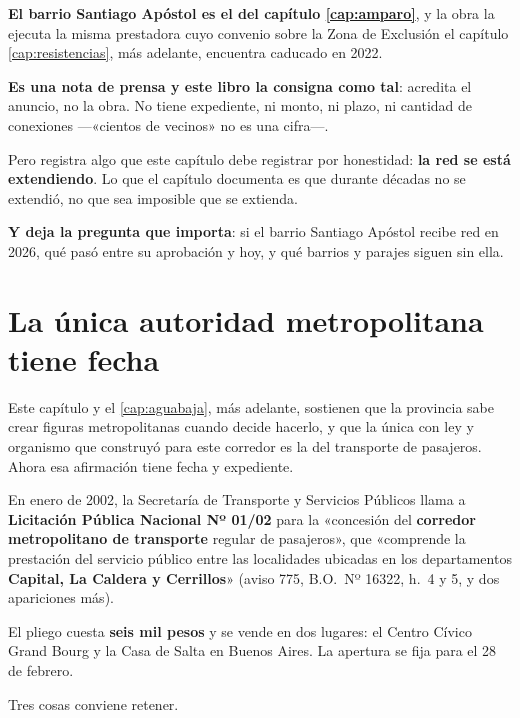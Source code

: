 \textbf{El barrio Santiago Apóstol es el del capítulo \ref{cap:amparo}}, y la obra la ejecuta la
misma prestadora cuyo convenio sobre la Zona de Exclusión el capítulo \ref{cap:resistencias}, más adelante,
encuentra caducado en 2022.

\begin{cautela}
\textbf{Es una nota de prensa y este libro la consigna como tal}: acredita el anuncio, no la
obra. No tiene expediente, ni monto, ni plazo, ni cantidad de conexiones ---«cientos de
vecinos» no es una cifra---.

Pero registra algo que este capítulo debe registrar por honestidad: \textbf{la red se está
extendiendo}. Lo que el capítulo documenta es que durante décadas no se extendió, no que sea
imposible que se extienda.

\textbf{Y deja la pregunta que importa}: si el barrio Santiago Apóstol recibe red en 2026, qué
pasó entre su aprobación y hoy, y qué barrios y parajes siguen sin ella.
\end{cautela}

\section{La única autoridad metropolitana tiene fecha}

Este capítulo y el \ref{cap:aguabaja}, más adelante, sostienen que la provincia sabe crear figuras metropolitanas cuando
decide hacerlo, y que la única con ley y organismo que construyó para este corredor es la del transporte de
pasajeros. Ahora esa afirmación tiene fecha y expediente.

En enero de 2002, la Secretaría de Transporte y Servicios Públicos llama a \textbf{Licitación
Pública Nacional Nº 01/02} para la «concesión del \textbf{corredor metropolitano de
transporte} regular de pasajeros», que «comprende la prestación del servicio público entre las
localidades ubicadas en los departamentos \textbf{Capital, La Caldera y Cerrillos}» (aviso 775,
B.O.\ Nº 16322, h.\ 4 y 5, y dos apariciones más).

El pliego cuesta \textbf{seis mil pesos} y se vende en dos lugares: el Centro Cívico Grand
Bourg y la Casa de Salta en Buenos Aires. La apertura se fija para el 28 de febrero.

Tres cosas conviene retener.

